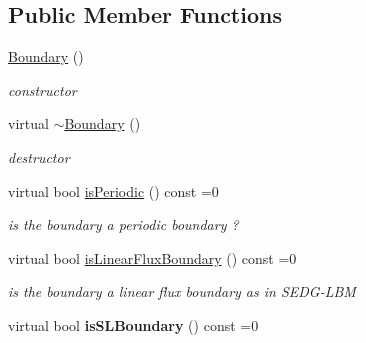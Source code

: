 \subsection*{Public Member Functions}
\begin{DoxyCompactItemize}
\item 
\hypertarget{classnatrium_1_1Boundary_a987978143b16ef0bbadd2b465dc1882d}{
\hyperlink{classnatrium_1_1Boundary_a987978143b16ef0bbadd2b465dc1882d}{Boundary} ()}
\label{classnatrium_1_1Boundary_a987978143b16ef0bbadd2b465dc1882d}

\begin{DoxyCompactList}\small\item\em constructor \item\end{DoxyCompactList}\item 
\hypertarget{classnatrium_1_1Boundary_a534f7d32a140c0764c61dce6129bf88f}{
virtual \hyperlink{classnatrium_1_1Boundary_a534f7d32a140c0764c61dce6129bf88f}{$\sim$Boundary} ()}
\label{classnatrium_1_1Boundary_a534f7d32a140c0764c61dce6129bf88f}

\begin{DoxyCompactList}\small\item\em destructor \item\end{DoxyCompactList}\item 
\hypertarget{classnatrium_1_1Boundary_a34309a0e46dad328a7e8b09c5ba2321c}{
virtual bool \hyperlink{classnatrium_1_1Boundary_a34309a0e46dad328a7e8b09c5ba2321c}{isPeriodic} () const =0}
\label{classnatrium_1_1Boundary_a34309a0e46dad328a7e8b09c5ba2321c}

\begin{DoxyCompactList}\small\item\em is the boundary a periodic boundary ? \item\end{DoxyCompactList}\item 
\hypertarget{classnatrium_1_1Boundary_ab8e9685a85a8f0243a49c574061b59a5}{
virtual bool \hyperlink{classnatrium_1_1Boundary_ab8e9685a85a8f0243a49c574061b59a5}{isLinearFluxBoundary} () const =0}
\label{classnatrium_1_1Boundary_ab8e9685a85a8f0243a49c574061b59a5}

\begin{DoxyCompactList}\small\item\em is the boundary a linear flux boundary as in SEDG-\/LBM \item\end{DoxyCompactList}\item 
\hypertarget{classnatrium_1_1Boundary_ad10921f5de82b00e5479c484f09de9e8}{
virtual bool {\bfseries isSLBoundary} () const =0}
\label{classnatrium_1_1Boundary_ad10921f5de82b00e5479c484f09de9e8}

\end{DoxyCompactItemize}


